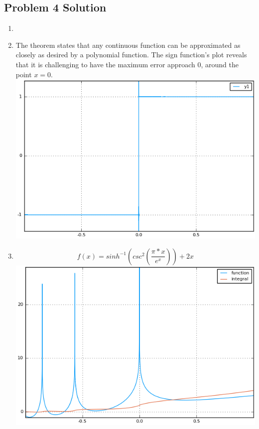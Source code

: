 \documentclass[]{article}
\begin{document}
\subsection{Problem 4 Solution} %
\begin{enumerate}
\def\labelenumi{\arabic{enumi}.}
\item
\item
The theorem states that any continuous function can be approximated as closely as desired by a polynomial function. The sign function's plot reveals that it is challenging to have the maximum error approach 0, around the point $x=0$. 
\hfill \break
\includegraphics[width=\textwidth,keepaspectratio]{Problem4Images/problem4part2.png}
\item
\[ f(x) = sinh^{-1}(csc^2 (\frac{\pi * x }{e^x})) +2x \]
\hfill \break
\includegraphics[width=\textwidth,keepaspectratio]{Problem4Images/problem4part3.png}

\end{enumerate}
\end{document}
